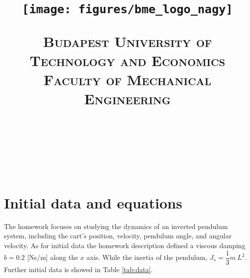 \documentclass[12pt]{article}
\title{\centering \texttt{[image: figures/bme\_logo\_nagy]}
\bigskip

\normalfont \normalsize \textsc{\centering Budapest University of Technology and Economics
\\ Faculty of Mechanical Engineering} \\ [12pt] \horrule{0.5pt} \\[0.4cm] \huge \HFCIME{} \\ \horrule{2pt} \\[0.5cm]}
\author{\NEV{}}
\begin{document}

\maketitle
\pagebreak

\pagebreak
\tableofcontents
\newpage
\section*{Initial data and equations}
The homework focuses on studying the dynamics of an inverted pendulum system, including the cart's position, velocity, pendulum angle, and angular velocity.
As for initial data the homework description defined a viscous damping $b = 0.2$ [Ns/m] along the $x$ axis. While the inertia of the pendulum, $J_s = \dfrac{1}{3} m ~ L^2$.\\
\noindent Further initial data is showed in Table \ref{tab:data}.
\end{document}
